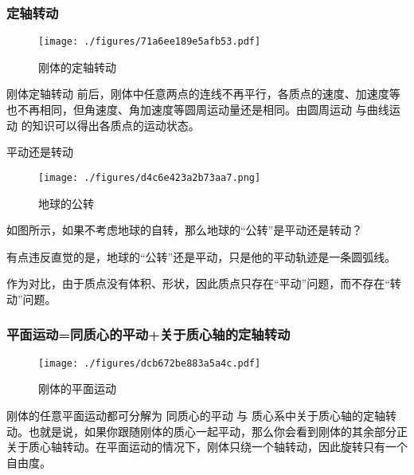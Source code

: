 \subsubsection{定轴转动}
\begin{figure}[ht]
\centering
\texttt{[image: ./figures/71a6ee189e5afb53.pdf]}
\caption{刚体的定轴转动} \label{fig_RGAB_2}
\end{figure}
刚体定轴转动 前后，刚体中任意两点的连线不再平行，各质点的速度、加速度等也不再相同，但角速度、角加速度等圆周运动量还是相同。由圆周运动 与曲线运动  的知识可以得出各质点的运动状态。

\begin{example}{平动还是转动}
\begin{figure}[ht]
\centering
\texttt{[image: ./figures/d4c6e423a2b73aa7.png]}
\caption{地球的公转} \label{fig_RGAB_4}
\end{figure}
如图所示，如果不考虑地球的自转，那么地球的“公转”是平动还是转动？

有点违反直觉的是，地球的“公转”还是平动，只是他的平动轨迹是一条圆弧线。
\end{example}
作为对比，由于质点没有体积、形状，因此质点只存在“平动”问题，而不存在“转动”问题。

\subsubsection{平面运动=同质心的平动+关于质心轴的定轴转动}
\begin{figure}[ht]
\centering
\texttt{[image: ./figures/dcb672be883a5a4c.pdf]}
\caption{刚体的平面运动} \label{fig_RGAB_3}
\end{figure}
刚体的任意平面运动都可分解为 同质心的平动 与 质心系中关于质心轴的定轴转动。也就是说，如果你跟随刚体的质心一起平动，那么你会看到刚体的其余部分正关于质心轴转动。在平面运动的情况下，刚体只绕一个轴转动，因此旋转只有一个自由度。


